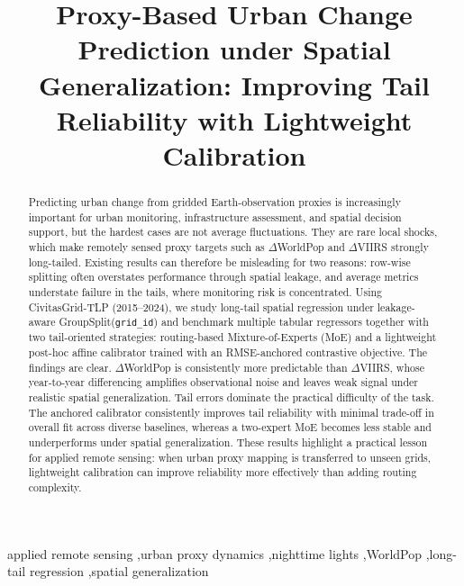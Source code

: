 \documentclass[preprint,12pt]{elsarticle}
\begin{document}
\begin{frontmatter}

\title{Proxy-Based Urban Change Prediction under Spatial Generalization: Improving Tail Reliability with Lightweight Calibration}

\begin{abstract}
Predicting urban change from gridded Earth-observation proxies is increasingly important for urban monitoring, infrastructure assessment, and spatial decision support, but the hardest cases are not average fluctuations. They are rare local shocks, which make remotely sensed proxy targets such as $\Delta$WorldPop and $\Delta$VIIRS strongly long-tailed. Existing results can therefore be misleading for two reasons: row-wise splitting often overstates performance through spatial leakage, and average metrics understate failure in the tails, where monitoring risk is concentrated. Using CivitasGrid-TLP (2015--2024), we study long-tail spatial regression under leakage-aware GroupSplit(\texttt{grid\_id}) and benchmark multiple tabular regressors together with two tail-oriented strategies: routing-based Mixture-of-Experts (MoE) and a lightweight post-hoc affine calibrator trained with an RMSE-anchored contrastive objective. The findings are clear. $\Delta$WorldPop is consistently more predictable than $\Delta$VIIRS, whose year-to-year differencing amplifies observational noise and leaves weak signal under realistic spatial generalization. Tail errors dominate the practical difficulty of the task. The anchored calibrator consistently improves tail reliability with minimal trade-off in overall fit across diverse baselines, whereas a two-expert MoE becomes less stable and underperforms under spatial generalization. These results highlight a practical lesson for applied remote sensing: when urban proxy mapping is transferred to unseen grids, lightweight calibration can improve reliability more effectively than adding routing complexity.
\end{abstract}

\begin{keyword}
applied remote sensing \sep urban proxy dynamics \sep nighttime lights \sep WorldPop \sep long-tail regression \sep spatial generalization
\end{keyword}

\end{frontmatter}

\linenumbers



\end{document}
